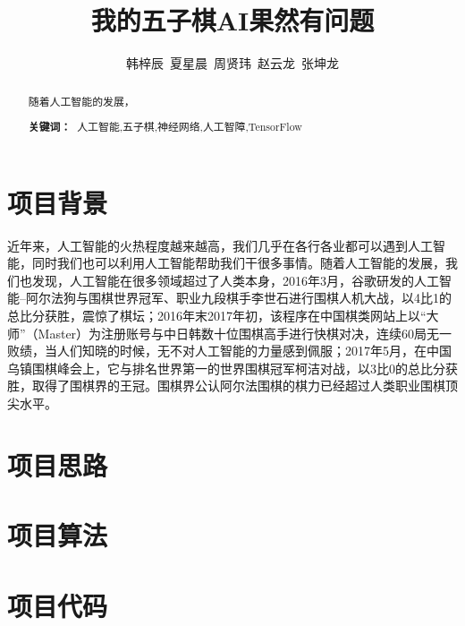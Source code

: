\documentclass[a4paper]{article}
\title{\heiti \Large 我的五子棋AI果然有问题}%
\author{\songti \small 韩梓辰\ 夏星晨\ 周贤玮\ 赵云龙\ 张坤龙}%
\renewcommand{\headrulewidth}{0.4pt}
\begin{document}
\maketitle%
\thispagestyle{fancy}%
\lhead{\textcolor{gray} {计算机科学}}
\rhead{\textcolor{gray} {DOI:xxxxxx}}
\renewcommand{\headrulewidth}{0.4pt}
\begin{abstract}
    随着人工智能的发展，
    \par\textbf{关键词：\ }人工智能,五子棋,神经网络,人工智障,TensorFlow
\end{abstract}
\tableofcontents  %
\newpage
    \begin{multicols}{2}
    \section{项目背景}
    近年来，人工智能的火热程度越来越高，我们几乎在各行各业都可以遇到人工智能，同时我们也可以利用人工智能帮助我们干很多事情。随着人工智能的发展，我们也发现，人工智能在很多领域超过了人类本身，2016年3月，谷歌研发的人工智能--阿尔法狗与围棋世界冠军、职业九段棋手李世石进行围棋人机大战，以4比1的总比分获胜，震惊了棋坛；2016年末2017年初，该程序在中国棋类网站上以“大师”（Master）为注册账号与中日韩数十位围棋高手进行快棋对决，连续60局无一败绩，当人们知晓的时候，无不对人工智能的力量感到佩服；2017年5月，在中国乌镇围棋峰会上，它与排名世界第一的世界围棋冠军柯洁对战，以3比0的总比分获胜，取得了围棋界的王冠。围棋界公认阿尔法围棋的棋力已经超过人类职业围棋顶尖水平。
    \section{项目思路}
    \section{项目算法}
    \section{项目代码}
    \newpage
    \begin{thebibliography}{30}%
    \end{thebibliography}
    \newpage
\end{multicols}
\end{document}

